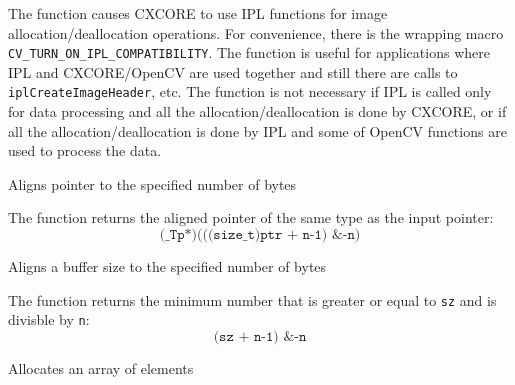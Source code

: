 \begin{description}
\end{description}


The function causes CXCORE to use IPL functions
for image allocation/deallocation operations. For convenience, there
is the wrapping macro \texttt{CV\_TURN\_ON\_IPL\_COMPATIBILITY}. The
function is useful for applications where IPL and CXCORE/OpenCV are used
together and still there are calls to \texttt{iplCreateImageHeader},
etc. The function is not necessary if IPL is called only for data
processing and all the allocation/deallocation is done by CXCORE, or
if all the allocation/deallocation is done by IPL and some of OpenCV
functions are used to process the data.

\fi

\fi

\ifCpp

Aligns pointer to the specified number of bytes

\begin{description}
\end{description}

The function returns the aligned pointer of the same type as the input pointer:
\[\texttt{(\_Tp*)(((size\_t)ptr + n-1) \& -n)}\]


Aligns a buffer size to the specified number of bytes

\begin{description}
\end{description}

The function returns the minimum number that is greater or equal to \texttt{sz} and is divisble by \texttt{n}:
\[\texttt{(sz + n-1) \& -n}\]


Allocates an array of elements

\begin{description}
\end{description}

